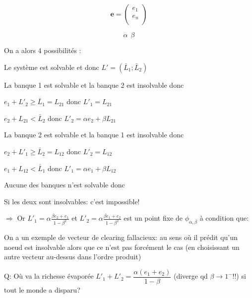 \documentclass[11pt,oneside,twocolumn]{article}
\begin{document}
\begin{equation*}
\textbf{e} = 
\begin{pmatrix}
e_{1} \\
e_{n} \\
\end{pmatrix}
\end{equation*}

\begin{equation*}
\alpha    \
\
\beta
\end{equation*}

On a alors 4 possibilités :

Le système est solvable et donc $L' = (\bar{L}_{1} ; \bar{L}_{2})$

La banque 1 est solvable et la banque 2 est insolvable donc 
\begin{center}
$e_{1} + L'_{2} \geq \bar{L}_{1} = L_{21}$ donc $L'_{1} = L_{21}$

$e_{2} + L_{21} < \bar{L}_{2}$ donc $L'_{2} = \alpha e_{2} + \beta L_{21}$
\end{center}

La banque 2 est solvable et la banque 1 est insolvable donc 
\begin{center}
$e_{2} + L'_{1} \geq \bar{L}_{2} = L_{12}$ donc $L'_{2} = L_{12}$

$e_{1} + L_{12} < \bar{L}_{1}$ donc $L'_{1} = \alpha e_{1} + \beta L_{12}$
\end{center}

Aucune des banques n'est solvable donc

Si les deux sont insolvables:
c'est impossible!

$\Longrightarrow$ Or $L'_{1} = \alpha \frac{\beta e_{2} + e_{1}}{1- \beta^{2}} $ et $L'_{2} = \alpha \frac{\beta e_{1} + e_{2}}{1 - \beta^{2}}$
est un point fixe de $\phi_{\alpha,\beta}$ à condition que:

On a un exemple de vecteur de clearing fallacieux: au sens où il prédit qu'un noeud est insolvable alors que ce n'est pas forcément le cas (en choisissant un autre vecteur au-dessus dans l'ordre produit)

Q: Où va la richesse évaporée 
$L'_1+L'_2= \dfrac{\alpha(e_1+e_2)}{1-\beta}$ (diverge qd $\beta\to 1^-$!!)
si tout le monde a disparu?
\end{document}
